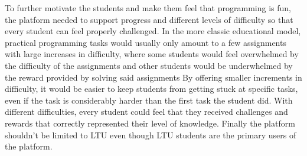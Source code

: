 To further motivate the students and make them feel that programming is fun, the platform needed to support progress and different levels of difficulty so that every student can feel properly challenged. In the more classic educational model, practical programming tasks would usually only amount to a few assignments with large increases in difficulty, where some students would feel overwhelmed by the difficulty of the assignments and other students would be underwhelmed by the reward provided by solving said assignments
By offering smaller increments in difficulty, it would be easier to keep students from getting stuck at specific tasks, even if the task is considerably harder than the first task the student did. With different difficulties, every student could feel that they received challenges and rewards that correctly represented their level of knowledge.
Finally the platform shouldn't be limited to LTU even though LTU students are the primary users of the platform.
